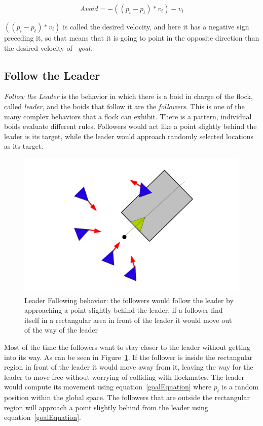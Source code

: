 \begin{equation}
\label{avoidEquation}
Avoid = -((p_i - p_t) * v_i) - v_i
\end{equation}

$((p_i - p_t) * v_i)$ is called the desired velocity, and here it has a negative sign preceding it, so that means that it is going to point in the opposite direction than the desired velocity of ~\textit{goal}.

\subsection{Follow the Leader}
\textit{Follow the Leader} is the behavior in which there is a boid in charge of the flock, called \textit{leader}, and the boids that follow it are the \textit{followers}. This is one of the many complex behaviors that a flock can exhibit. There is a pattern, individual boids evaluate different rules. Followers would act like a point slightly behind the leader is its target, while the leader would approach randomly selected locations as its target.

\begin{figure}[htbp]
\begin{center}
\includegraphics[scale=0.5]{figures/leaderFollowing.pdf}
\caption{Leader Following behavior: the followers would follow the leader by approaching a point slightly behind the leader, if a follower find itself in a rectangular area in front of the leader it would move out of the way of the leader}
\label{leaderPDF}
\end{center}
\end{figure}

Most of the time the followers want to stay closer to the leader without getting into its way. As can be seen in Figure~\ref{leaderPDF}.  If the follower is inside the rectangular region in front of the leader it would move away from it, leaving the way for the leader to move free without worrying of colliding with flockmates. The leader would compute its movement using equation~\ref{goalEquation} where $p_t$ is a random position within the global space. The followers that are outside the rectangular region will approach a point slightly behind from the leader using equation~\ref{goalEquation}.

